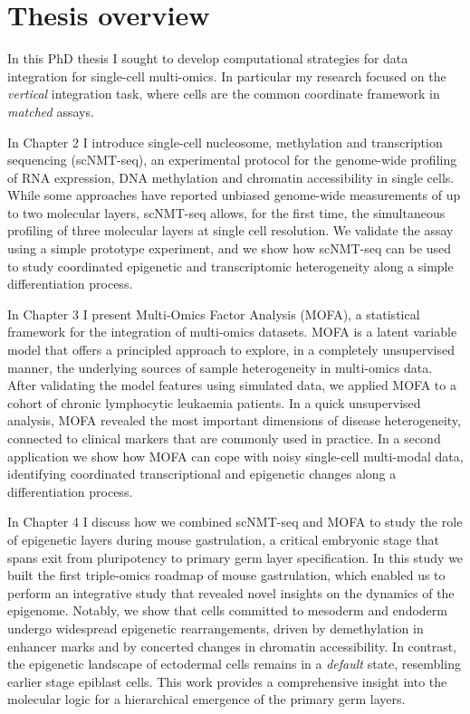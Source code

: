 \section{Thesis overview}

In this PhD thesis I sought to develop computational strategies for data integration for single-cell multi-omics. In particular my research focused on the \textit{vertical} integration task, where cells are the common coordinate framework in \textit{matched} assays.

In Chapter 2 I introduce single-cell nucleosome, methylation and transcription sequencing (scNMT-seq), an experimental protocol for the genome-wide profiling of RNA expression, DNA methylation and chromatin accessibility in single cells. While some approaches have reported unbiased genome-wide measurements of up to two molecular layers, scNMT-seq allows, for the first time, the simultaneous profiling of three molecular layers at single cell resolution. We validate the assay using a simple prototype experiment, and we show how scNMT-seq can be used to study coordinated epigenetic and transcriptomic heterogeneity along a simple differentiation process.

In Chapter 3 I present Multi-Omics Factor Analysis (MOFA), a statistical framework for the integration of multi-omics datasets. MOFA is a latent variable model that offers a principled approach to explore, in a completely unsupervised manner, the underlying sources of sample heterogeneity in multi-omics data. After validating the model features using simulated data, we applied MOFA to a cohort of chronic lymphocytic leukaemia patients. In a quick unsupervised analysis, MOFA revealed the most important dimensions of disease heterogeneity, connected to clinical markers that are commonly used in practice. In a second application we show how MOFA can cope with noisy single-cell multi-modal data, identifying coordinated transcriptional and epigenetic changes along a differentiation process.

In Chapter 4 I discuss how we combined scNMT-seq and MOFA to study the role of epigenetic layers during mouse gastrulation, a critical embryonic stage that spans exit from pluripotency to primary germ layer specification. In this study we built the first triple-omics roadmap of mouse gastrulation, which enabled us to perform an integrative study that revealed novel insights on the dynamics of the epigenome. Notably, we show that cells committed to mesoderm and endoderm undergo widespread epigenetic rearrangements, driven by demethylation in enhancer marks and by concerted changes in chromatin accessibility. In contrast, the epigenetic landscape of ectodermal cells remains in a \textit{default} state, resembling earlier stage epiblast cells. This work provides a comprehensive insight into the molecular logic for a hierarchical emergence of the primary germ layers.

